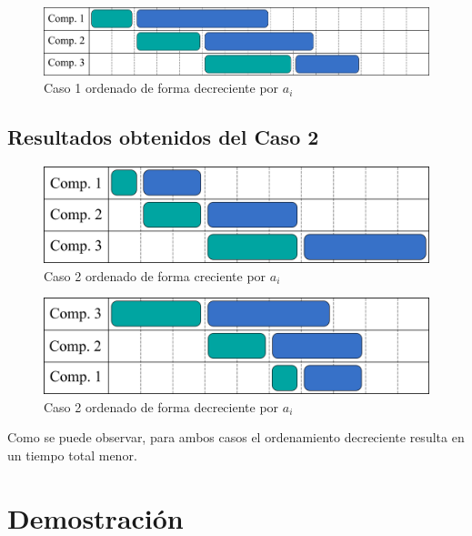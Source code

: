 \begin{figure}[H]
    \centering
    \includegraphics[width=1\textwidth]{img/caso-1-decreciente.png}
    \caption{Caso 1 ordenado de forma decreciente por $a_i$}
    \label{fig:Caso 1 ordenado de forma decreciente por $a_i$}
\end{figure}


\subsection{Resultados obtenidos del Caso 2}

\begin{figure}[H]
    \centering
    \includegraphics[width=1\textwidth]{img/caso-2-creciente.png}
    \caption{Caso 2 ordenado de forma creciente por $a_i$}
    \label{fig:Caso 2 ordenado de forma creciente por $a_i$}
\end{figure}

\begin{figure}[H]
    \centering
    \includegraphics[width=1\textwidth]{img/caso-2-decreciente.png}
    \caption{Caso 2 ordenado de forma decreciente por $a_i$}
    \label{fig:Caso 2 ordenado de forma decreciente por $a_i$}
\end{figure}

Como se puede observar, para ambos casos el ordenamiento decreciente resulta en un tiempo total menor.

\section{Demostración}

